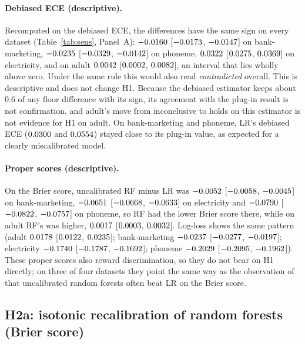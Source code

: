 \documentclass[11pt]{article}
\newcommand{\md}[3]{$#1$ [$#2$, $#3$]}
\newcommand{\ds}[1]{\textsf{#1}}
\newcommand{\ad}{\ds{adult}}
\newcommand{\bm}{\ds{bank-marketing}}
\newcommand{\el}{\ds{electricity}}
\newcommand{\ph}{\ds{phoneme}}
\newcommand{\cat}[1]{\emph{#1}}
\begin{document}
\paragraph{Debiased ECE (descriptive).} Recomputed on the debiased ECE, the differences have
the same sign on every dataset (Table~\ref{tab:sens}, Panel~A): \md{\HOneDbBankMean}{\HOneDbBankLo}{\HOneDbBankHi}
on \bm, \md{\HOneDbPhonemeMean}{\HOneDbPhonemeLo}{\HOneDbPhonemeHi} on \ph,
\md{\HOneDbElecMean}{\HOneDbElecLo}{\HOneDbElecHi} on \el, and on \ad{}
\md{\HOneDbAdultMean}{\HOneDbAdultLo}{\HOneDbAdultHi}, an interval that lies wholly above zero.
Under the same rule this would also read \cat{contradicted} overall. This is descriptive and
does not change H1. Because the debiased estimator keeps about 0.6 of any floor difference
with its sign, its agreement with the plug-in result is not confirmation, and \ad's move from
inconclusive to holds on this estimator is not evidence for H1 on \ad. On \bm{} and \ph,
LR's debiased ECE ($0.0300$ and $0.0554$) stayed close to its plug-in
value, as expected for a clearly miscalibrated model.

\paragraph{Proper scores (descriptive).} On the Brier score, uncalibrated RF minus LR was
\md{\BankRfMinusLrBrierMean}{\BankRfMinusLrBrierLo}{\BankRfMinusLrBrierHi} on \bm,
\md{\ElecRfMinusLrBrierMean}{\ElecRfMinusLrBrierLo}{\ElecRfMinusLrBrierHi} on \el{} and
\md{\PhonemeRfMinusLrBrierMean}{\PhonemeRfMinusLrBrierLo}{\PhonemeRfMinusLrBrierHi} on \ph,
so RF had the lower Brier score there, while on \ad{} RF's was higher,
\md{\AdultRfMinusLrBrierMean}{\AdultRfMinusLrBrierLo}{\AdultRfMinusLrBrierHi}. Log-loss shows
the same pattern (\ad{} \md{\AdultRfMinusLrLoglossMean}{\AdultRfMinusLrLoglossLo}{\AdultRfMinusLrLoglossHi};
\bm{} \md{\BankRfMinusLrLoglossMean}{\BankRfMinusLrLoglossLo}{\BankRfMinusLrLoglossHi};
\el{} \md{\ElecRfMinusLrLoglossMean}{\ElecRfMinusLrLoglossLo}{\ElecRfMinusLrLoglossHi};
\ph{} \md{\PhonemeRfMinusLrLoglossMean}{\PhonemeRfMinusLrLoglossLo}{\PhonemeRfMinusLrLoglossHi}).
These proper scores also reward discrimination, so they do not bear on H1 directly; on three
of four datasets they point the same way as the observation of \citet{fonseca2017} that
uncalibrated random forests often beat LR on the Brier score.

\subsection{H2a: isotonic recalibration of random forests (Brier score)}
\label{sec:h2a}
\end{document}
